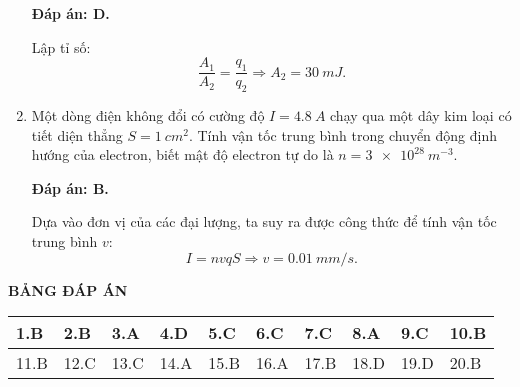 \begin{enumerate}[label=\bfseries Câu \arabic*:]
{	}
	\loigiai
	{	\textbf{Đáp án: D.}
		
		Lập tỉ số:
		$$\dfrac{A_1}{A_2}=\dfrac{q_1}{q_2} \Rightarrow A_2 = \SI{30}{mJ}.$$
	}
	\item {}
	
	\cauhoi
	{Một dòng điện không đổi có cường độ $I=\SI{4.8}{A}$ chạy qua một dây kim loại có tiết diện thẳng $S=\SI{1}{cm^2}$. Tính vận tốc trung bình trong chuyển động định hướng của electron, biết mật độ electron tự do là $n=\SI{3e28}{m^{-3}}$.
		
	}
	\loigiai
	{	\textbf{Đáp án: B.}
		
		Dựa vào đơn vị của các đại lượng, ta suy ra được công thức để tính vận tốc trung bình $v$:
		$$I=nvqS \Rightarrow v = \SI{0.01}{mm/s}.$$
	}
\end{enumerate}

\whiteBGstarEnd

\loigiai
{
	\begin{center}
		\textbf{BẢNG ĐÁP ÁN}
	\end{center}
	\begin{center}
		\begin{tabular}{|m{2.8em}|m{2.8em}|m{2.8em}|m{2.8em}|m{2.8em}|m{2.8em}|m{2.8em}|m{2.8em}|m{2.8em}|m{2.8em}|}
			\hline
			1.B  & 2.B  & 3.A  & 4.D  & 5.C  & 6.C  & 7.C  & 8.A  & 9.C  & 10.B  \\
			\hline
			11.B  & 12.C  & 13.C  & 14.A  & 15.B  & 16.A  & 17.B  & 18.D  & 19.D  & 20.B  \\
			\hline
		\end{tabular}
	\end{center}
}
